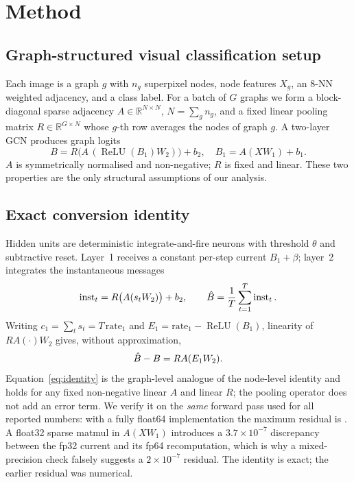 \section{Method}
\label{sec:method}

\subsection{Graph-structured visual classification setup}
\label{ssec:setup}

Each image is a graph $g$ with $n_g$ superpixel nodes, node features $X_g$, an 8-NN weighted adjacency, and a class label. For a batch of $G$ graphs we form a block-diagonal sparse adjacency $A\in\mathbb{R}^{N\times N}$, $N=\sum_g n_g$, and a fixed linear pooling matrix $R\in\mathbb{R}^{G\times N}$ whose $g$-th row averages the nodes of graph $g$. A two-layer GCN produces graph logits
\begin{equation}
B = R\big(A\,(\operatorname{ReLU}(B_1) W_2)\big) + b_2,\quad
B_1 = A (X W_1) + b_1 .
\label{eq:ann}
\end{equation}
$A$ is symmetrically normalised and non-negative; $R$ is fixed and linear. These two properties are the only structural assumptions of our analysis.

\subsection{Exact conversion identity}
\label{ssec:identity}

Hidden units are deterministic integrate-and-fire neurons with threshold $\theta$ and subtractive reset. Layer~1 receives a constant per-step current $B_1+\beta$; layer~2 integrates the instantaneous messages
\begin{equation}
\operatorname{inst}_t = R\big(A (s_t W_2)\big) + b_2,\qquad
\hat{B} = \frac{1}{T}\sum_{t=1}^{T} \operatorname{inst}_t .
\label{eq:convert}
\end{equation}
Writing $c_1=\sum_t s_t = T\,\mathrm{rate}_1$ and $E_1=\mathrm{rate}_1-\operatorname{ReLU}(B_1)$, linearity of $R A (\cdot) W_2$ gives, without approximation,
\begin{equation}
\hat{B} - B = R A (E_1 W_2).
\label{eq:identity}
\end{equation}
Equation~\eqref{eq:identity} is the graph-level analogue of the node-level identity and holds for any fixed non-negative linear $A$ and linear $R$; the pooling operator does not add an error term. We verify it on the \emph{same} forward pass used for all reported numbers: with a fully float64 implementation the maximum residual is \IdentityMax. A float32 sparse matmul in $A(XW_1)$ introduces a $3.7\times10^{-7}$ discrepancy between the fp32 current and its fp64 recomputation, which is why a mixed-precision check falsely suggests a $2\times10^{-7}$ residual. The identity is exact; the earlier residual was numerical.

